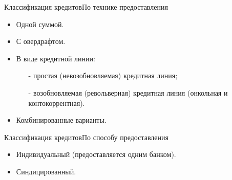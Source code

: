 \documentclass[_DKB_p2_Credit.tex]{subfiles}
\begin{document}
\begin{frame}{Классификация кредитов}{По технике предоставления}
\begin{itemize}
\item
Одной суммой.
\item
С овердрафтом. 
\item
В виде кредитной линии:
\begin{enumerate}
\item[-]
простая (невозобновляемая) кредитная линия;
\item[-]
возобновляемая (револьверная) кредитная линия (онкольная и контокоррентная).
\end{enumerate}
\item
Комбинированные варианты.
\end{itemize}
\end{frame}

\begin{frame}{Классификация кредитов}{По способу предоставления}
\begin{itemize}
\item
Индивидуальный (предоставляется одним банком).
\item
Синдицированный.
\end{itemize}
\end{frame}
\end{document}
